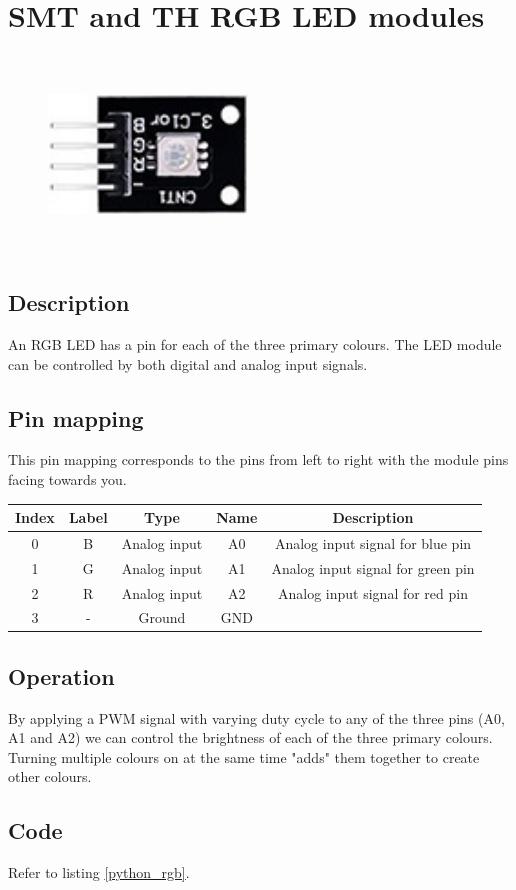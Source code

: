 \section{SMT and TH RGB LED modules}
\begin{figure}[H]
    \centering
    \includegraphics[angle=0, keepaspectratio=true, scale=1, width=200px, height=200px]{images/smd_led.jpg}
\end{figure}
\subsection*{Description}
An RGB LED has a pin for each of the three primary colours. The LED module can be controlled by both digital and analog input signals.
\subsection*{Pin mapping}
This pin mapping corresponds to the pins from left to right with the module pins facing towards you.
\begin{table}[H]
    \centering
    \begin{tabular}{|c|c|c|c|c|}
    \hline
    Index &Label &Type &Name &Description\\ \hline
    0 &B &Analog input &A0 &Analog input signal for blue pin \\ \hline
    1 &G &Analog input  &A1 &Analog input signal for green pin \\ \hline
    2 &R &Analog input  &A2 &Analog input signal for red pin \\ \hline
    3 &- &Ground &GND &\\ \hline
    \end{tabular}
\end{table}
\subsection*{Operation}
By applying a PWM signal with varying duty cycle to any of the three pins (A0, A1 and A2) we can control the brightness of each of the three primary colours. Turning multiple colours on at the same time "adds" them together to create other colours.
\subsection*{Code}
Refer to listing \ref{python_rgb}.
%